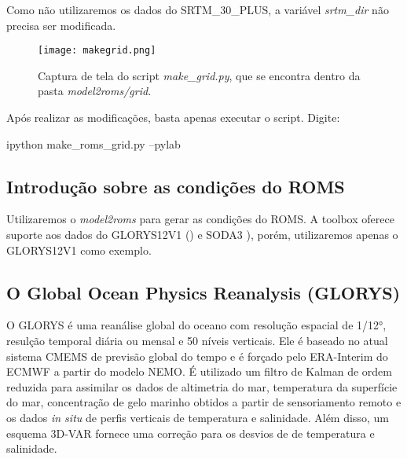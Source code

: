 \begin{tcolorbox}[enhanced,
    grow to left by   = 0cm,
    grow to right by  = 0cm,
    enlarge top by    = 0cm,
    enlarge bottom by = 0cm,
    tcbox raise base,
    boxrule           = 1.0pt,
    left              = 18mm,
    colframe          = red!50!black,coltext=red!25!black,colback=red!10!white,
    overlay           = {\begin{tcbclipinterior}\fill[red!75!blue!50!white] (frame.south west)
      rectangle node[text=white,font=\sffamily\bfseries\footnotesize,rotate=0] {ATENÇÃO} ([xshift=18mm]frame.north west);\end{tcbclipinterior}}]
  Como não utilizaremos os dados do SRTM\_30\_PLUS, a variável \textit{srtm\_dir} não precisa ser modificada.
\end{tcolorbox}
\bigskip

\begin{figure}[H]
    \centering
    \texttt{[image: makegrid.png]}
    \caption{Captura de tela do script \textit{make\_grid.py}, que se encontra dentro da pasta \textit{model2roms/grid}.}
    \label{fazgrade}
\end{figure}
\bigskip

\noindent Após realizar as modificações, basta apenas executar o script. Digite:
\bigskip

\begin{bashcode}
ipython make_roms_grid.py --pylab
\end{bashcode}
\bigskip

\subsection{Introdução sobre as condições do ROMS}
\bigskip

\noindent Utilizaremos o \textit{model2roms} para gerar as condições do ROMS. A toolbox oferece suporte aos dados do GLORYS12V1 (\cite{Fernandez2018}) e SODA3 \cite{Carton2018}), porém, utilizaremos apenas o GLORYS12V1 como exemplo.

\subsection{O Global Ocean Physics Reanalysis (GLORYS)}
\bigskip

\noindent  O GLORYS é uma reanálise global do oceano com resolução espacial de 1/12°, resulção temporal diária ou mensal e 50 níveis verticais. Ele é baseado no atual sistema CMEMS de previsão global do tempo e é forçado pelo ERA-Interim do ECMWF a partir do modelo NEMO. É utilizado um filtro de Kalman de ordem reduzida para assimilar os dados de altimetria do mar, temperatura da superfície do mar, concentração de gelo marinho obtidos a partir de sensoriamento remoto e os dados \textit{in situ} de perfis verticais de temperatura e salinidade. Além disso, um esquema 3D-VAR fornece uma correção para os desvios de de temperatura e salinidade. 
\bigskip


